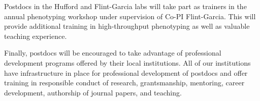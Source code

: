 Postdocs in the Hufford and Flint-Garcia labs will take part as trainers in the annual phenotyping workshop under supervision of Co-PI Flint-Garcia.  This will provide additional training in high-throughput phenotyping as well as valuable teaching experience.

Finally, postdocs will be encouraged to take advantage of professional development programs offered by their local institutions. All of our institutions have infrastructure in place for professional development of postdocs and offer training in responsible conduct of research, grantsmanship, mentoring, career development, authorship of journal papers, and teaching. 


